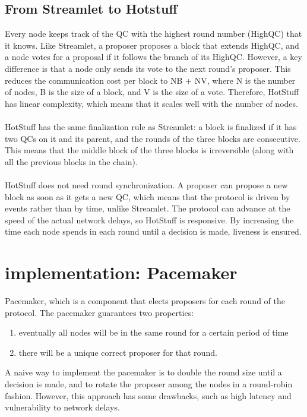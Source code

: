 \documentclass{report}
\begin{document}
\subsection{From Streamlet to Hotstuff}
Every node keeps track of the QC with the highest round number (HighQC) that it knows. Like Streamlet, a proposer proposes a block that extends HighQC, and a node votes for a proposal if it follows the branch of its HighQC. However, a key difference is that a node only sends its vote to the next round’s proposer. This reduces the communication cost per block to NB + NV, where N is the number of nodes, B is the size of a block, and V is the size of a vote. Therefore, HotStuff has linear complexity, which means that it scales well with the number of nodes.\\\\
HotStuff has the same finalization rule as Streamlet: a block is finalized if it has two QCs on it and its parent, and the rounds of the three blocks are consecutive. This means that the middle block of the three blocks is irreversible (along with all the previous blocks in the chain).\\\\
HotStuff does not need round synchronization. A proposer can propose a new block as soon as it gets a new QC, which means that the protocol is driven by events rather than by time, unlike Streamlet. The protocol can advance at the speed of the actual network delays, so HotStuff is responsive. By increasing the time each node spends in each round until a decision is made, liveness is ensured.

\section{implementation: Pacemaker}
Pacemaker, which is a component that elects proposers for each round of the protocol.
The pacemaker guarantees two properties:
\begin{enumerate}
	\item eventually all nodes will be in the same round for a certain period of time
	\item there will be a unique correct proposer for that round.
\end{enumerate}
A naive way to implement the pacemaker is to double the round size until a decision is made, and to rotate the proposer among the nodes in a round-robin fashion. However, this approach has some drawbacks, such as high latency and vulnerability to network delays.
\end{document}
